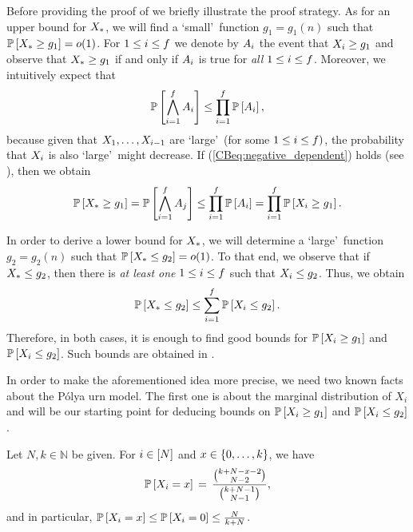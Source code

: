 Before providing the proof of  we briefly illustrate the proof strategy. As for an upper bound for ${X_*}$, we will find a \lq small\rq\ function $g_1=g_1(n)$ such that $\mathbb{P}\left[{X_*}\geq g_1\right]=o(1)$. For $1\leq i \leq f$ we denote by $A_i$ the event that $X_i\geq g_1$ and observe that ${X_*}\geq g_1$ if and only if $A_i$ is true for {\em all} $1\leq i \leq f$. Moreover, we intuitively expect that 
\begin{align}\label{CBeq:negative_dependent}
\mathbb{P}\left[\bigwedge_{i=1}^{f}A_i\right]\leq \prod_{i=1}^{f}\mathbb{P}\left[A_i\right],
\end{align}
because given that $X_1, \ldots, X_{i-1}$ are \lq large\rq\ (for some $1\leq i \leq f)$, the probability that $X_i$ is also \lq large\rq\ might decrease. 
If (\ref{CBeq:negative_dependent}) holds (see ), then we obtain
\begin{align*}
\mathbb{P}\left[{X_*}\geq g_1\right]=\mathbb{P}\left[\bigwedge_{i=1}^{f}A_j\right]\leq \prod_{i=1}^{f}\mathbb{P}\left[A_i\right] = \prod_{i=1}^{f} \mathbb{P}\left[X_i \geq g_1\right].
\end{align*}

In order to derive a lower bound for ${X_*}$, we will determine a \lq large\rq\ function $g_2=g_2(n)$ such that $\mathbb{P}\left[{X_*}\leq g_2\right]=o(1)$. To that end, we observe that if ${X_*} \leq g_2$, then there is {\em at least one} $1\leq i \leq f$ such that $X_i \leq g_2$. Thus, we obtain
\begin{align*}
\mathbb{P}\left[{X_*}\leq g_2\right]\leq \sum_{i=1}^{f}\mathbb{P}\left[X_i \leq g_2\right].
\end{align*}
Therefore, in both cases, it is enough to find good bounds for $\mathbb{P}\left[X_i \geq g_1\right]$ and $\mathbb{P}\left[X_i \leq g_2\right]$. Such bounds are obtained in . 

In order to make the aforementioned idea more precise, we need two known facts about the P\'olya urn model. The first one is about the marginal distribution of $X_i$ and will be our starting point for deducing bounds on $\mathbb{P}\left[X_i \geq g_1\right]$ and $\mathbb{P}\left[X_i \leq g_2\right]$. 

\begin{prop}\label{CBprop:polya}
	Let $N,k\in \mathbb N$ be given. For $i \in \left[N\right]$ and $x \in \{0, \ldots, k\}$, we have
	\begin{equation*}
	\mathbb{P}\left[X_i=x\right] \, =\, \frac{\binom{k+N-x-2}{N-2}}{\binom{k+N-1}{N-1}},
	\end{equation*}
	and in particular, $\mathbb{P}\left[X_i=x\right] \le \mathbb{P}\left[X_i=0\right] \le \frac{N}{k+N}$.
\end{prop}

